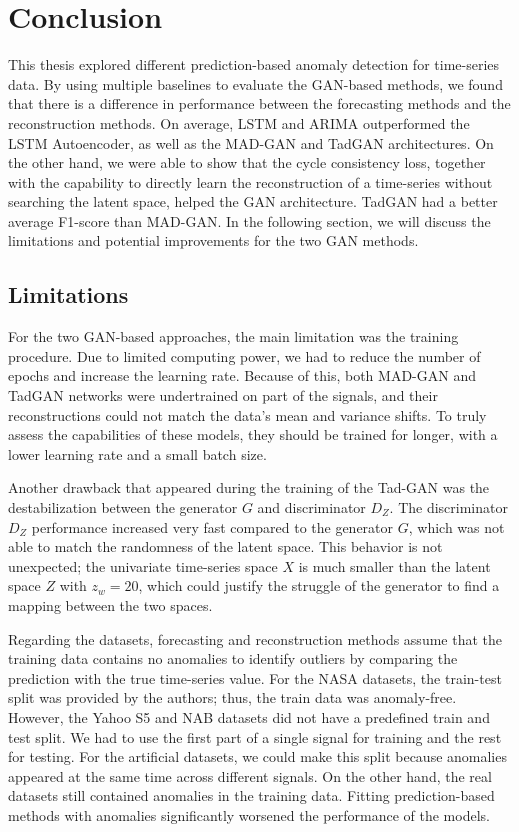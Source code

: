 \chapter{Conclusion}
\label{chap:06-conclusion}

This thesis explored different prediction-based anomaly detection for time-series data. By using multiple baselines to evaluate the GAN-based methods, we found that there is a difference in performance between the forecasting methods and the reconstruction methods. On average, LSTM and ARIMA outperformed the LSTM Autoencoder, as well as the MAD-GAN and TadGAN architectures. On the other hand, we were able to show that the cycle consistency loss, together with the capability to directly learn the reconstruction of a time-series without searching the latent space, helped the GAN architecture. TadGAN had a better average F1-score than MAD-GAN. In the following section, we will discuss the limitations and potential improvements for the two GAN methods. 

\section*{Limitations}
\label{sec:06-limitations}
For the two GAN-based approaches, the main limitation was the training procedure. Due to limited computing power, we had to reduce the number of epochs and increase the learning rate. Because of this, both MAD-GAN and TadGAN networks were undertrained on part of the signals, and their reconstructions could not match the data's mean and variance shifts. To truly assess the capabilities of these models, they should be trained for longer, with a lower learning rate and a small batch size.

Another drawback that appeared during the training of the Tad-GAN was the destabilization between the generator $G$ and discriminator $D_Z$. The discriminator $D_Z$ performance increased very fast compared to the generator $G$, which was not able to match the randomness of the latent space. This behavior is not unexpected; the univariate time-series space $X$ is much smaller than the latent space $Z$ with $z_w =20$, which could justify the struggle of the generator to find a mapping between the two spaces.

Regarding the datasets, forecasting and reconstruction methods assume that the training data contains no anomalies to identify outliers by comparing the prediction with the true time-series value. For the NASA datasets, the train-test split was provided by the authors; thus, the train data was anomaly-free. However, the Yahoo S5 and NAB datasets did not have a predefined train and test split. We had to use the first part of a single signal for training and the rest for testing. For the artificial datasets, we could make this split because anomalies appeared at the same time across different signals. On the other hand, the real datasets still contained anomalies in the training data. Fitting prediction-based methods with anomalies significantly worsened the performance of the models.


